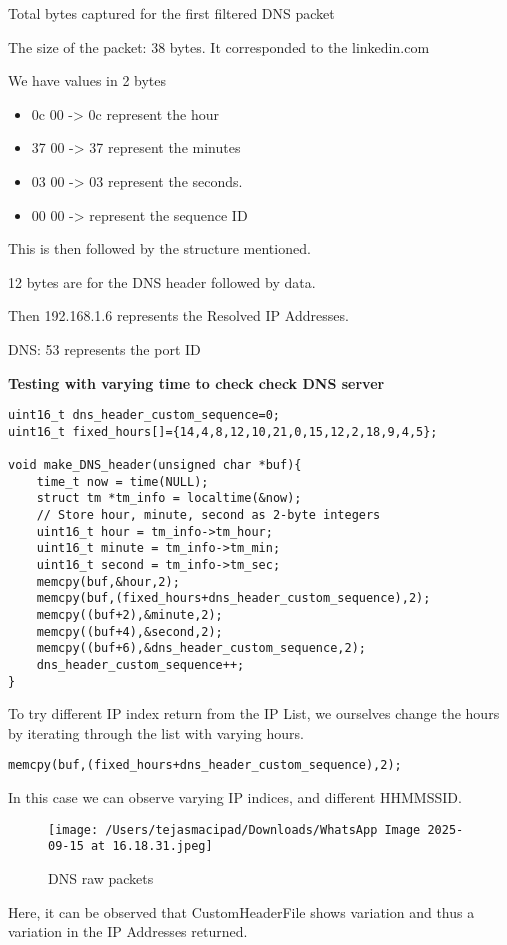 \documentclass[12pt, a4paper]{report}
\begin{document}
Total bytes captured for the first filtered DNS packet

The size of the packet: 38 bytes.
It corresponded to the linkedin.com

We have values in 2 bytes
\begin{itemize}
    \item 0c 00 -> 0c represent the hour
    \item 37 00 -> 37 represent the minutes
    \item 03 00 -> 03 represent the seconds.
    \item 00 00 -> represent the sequence ID
\end{itemize}

This is then followed by the structure mentioned.

12 bytes are for the DNS header followed by data.

Then 192.168.1.6 represents the Resolved IP Addresses.

DNS: 53 represents the port ID

\newpage
\textbf{Testing with varying time to check check DNS server}

\begin{lstlisting}[caption={Testing}]
uint16_t dns_header_custom_sequence=0;
uint16_t fixed_hours[]={14,4,8,12,10,21,0,15,12,2,18,9,4,5};

void make_DNS_header(unsigned char *buf){
    time_t now = time(NULL);
    struct tm *tm_info = localtime(&now);
    // Store hour, minute, second as 2-byte integers
    uint16_t hour = tm_info->tm_hour;
    uint16_t minute = tm_info->tm_min;
    uint16_t second = tm_info->tm_sec;
    memcpy(buf,&hour,2);
    memcpy(buf,(fixed_hours+dns_header_custom_sequence),2);
    memcpy((buf+2),&minute,2);
    memcpy((buf+4),&second,2);
    memcpy((buf+6),&dns_header_custom_sequence,2);
    dns_header_custom_sequence++;
}
\end{lstlisting}

To try different IP index return from the IP List, we ourselves change the hours by iterating through the list with varying hours.

\begin{lstlisting}[caption={Testing}]
memcpy(buf,(fixed_hours+dns_header_custom_sequence),2);

\end{lstlisting}

In this case we can observe varying IP indices, and different HHMMSSID.

\begin{figure}[h!]
    \centering
    \texttt{[image: /Users/tejasmacipad/Downloads/WhatsApp Image 2025-09-15 at 16.18.31.jpeg]}
    \caption{DNS raw packets}
    \label{fig:your-label5}
\end{figure}

Here, it can be observed that CustomHeaderFile shows variation and thus a variation in the IP Addresses returned.
\end{document}
